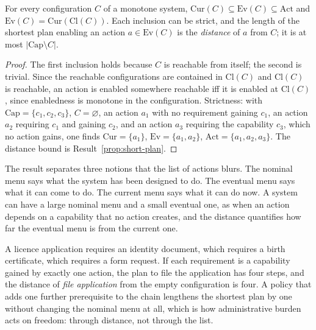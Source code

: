 \begin{newresult}\label{prop:three-menus}
For every configuration $C$ of a monotone system, $\mathrm{Cur}(C)\subseteq\mathrm{Ev}(C)\subseteq\mathrm{Act}$ and $\mathrm{Ev}(C)=\mathrm{Cur}(\mathrm{Cl}(C))$. Each inclusion can be strict, and the length of the shortest plan enabling an action $a\in\mathrm{Ev}(C)$ is the \emph{distance} of $a$ from $C$; it is at most $|\mathrm{Cap}\setminus C|$.
\end{newresult}
\begin{proof}
The first inclusion holds because $C$ is reachable from itself; the second is trivial. Since the reachable configurations are contained in $\mathrm{Cl}(C)$ and $\mathrm{Cl}(C)$ is reachable, an action is enabled somewhere reachable iff it is enabled at $\mathrm{Cl}(C)$, since enabledness is monotone in the configuration. Strictness: with $\mathrm{Cap}=\{c_1,c_2,c_3\}$, $C=\varnothing$, an action $a_1$ with no requirement gaining $c_1$, an action $a_2$ requiring $c_1$ and gaining $c_2$, and an action $a_3$ requiring the capability $c_3$, which no action gains, one finds $\mathrm{Cur}=\{a_1\}$, $\mathrm{Ev}=\{a_1,a_2\}$, $\mathrm{Act}=\{a_1,a_2,a_3\}$. The distance bound is Result~\ref{prop:short-plan}.
\end{proof}

The result separates three notions that the list of actions blurs. The nominal menu says what the system has been designed to do. The eventual menu says what it can come to do. The current menu says what it can do now. A system can have a large nominal menu and a small eventual one, as when an action depends on a capability that no action creates, and the distance quantifies how far the eventual menu is from the current one.

\begin{example}\label{ex:chain}
A licence application requires an identity document, which requires a birth certificate, which requires a form request. If each requirement is a capability gained by exactly one action, the plan to file the application has four steps, and the distance of \emph{file application} from the empty configuration is four. A policy that adds one further prerequisite to the chain lengthens the shortest plan by one without changing the nominal menu at all, which is how administrative burden acts on freedom: through distance, not through the list.
\end{example}

